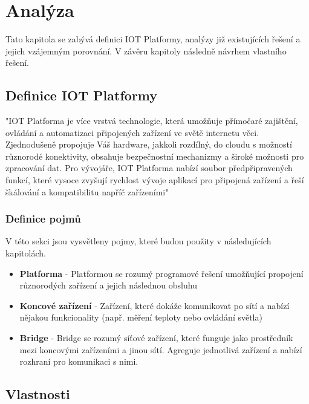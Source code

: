 \chapter{Analýza}
Tato kapitola se zabývá definici IOT Platformy, analýzy již existujících řešení a jejich vzájemným porovnání. V závěru kapitoly následně návrhem vlastního řešení.


\section{Definice IOT Platformy}
"IOT Platforma je více vrstvá technologie, která umožňuje přímočaré zajištění, ovládání a automatizaci připojených zařízení ve světě internetu věci. Zjednodušeně propojuje Váš hardware, jakkoli rozdílný, do cloudu s možností různorodé konektivity, obsahuje bezpečnostní mechanizmy a široké možnosti pro zpracování dat. Pro vývojáře, IOT Platforma nabízí soubor předpřipravených funkcí, které vysoce zvyšují rychlost vývoje aplikací pro připojená zařízení a řeší škálování a kompatibilitu napříč zařízeními" \cite[překlad autora]{kaaproject}

\subsection{Definice pojmů}
V této sekci jsou vysvětleny pojmy, které budou použity v následujících kapitolách.

\begin{itemize}
    \item \textbf{Platforma} - Platformou se rozumý programové řešení umožňující propojení různorodých zařízení a jejich následnou obsluhu
    \item \textbf{Koncové zařízení} - Zařízení, které dokáže komunikovat po sítí a nabízí nějakou funkcionality (např. měření teploty nebo ovládání světla)
    \item \textbf{Bridge} - Bridge se rozumý síťové zařízení, které funguje jako prostředník mezi koncovými zařízeními a jinou sítí. Agreguje jednotlivá zařízení a nabízí rozhraní pro komunikaci s nimi.
\end{itemize}


\section{Vlastnosti}


